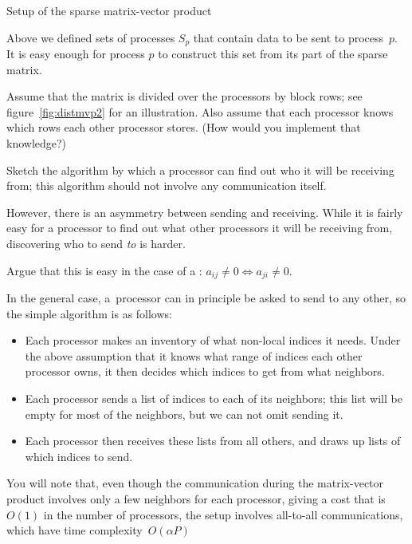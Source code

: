  {Setup of the sparse matrix-vector product}
\label{sec:par-spmvp-setup}

Above we defined sets of processes $S_p$ that contain data
to be sent to process~$p$.
It is easy enough for process $p$ to construct this set
from its part of the sparse matrix.

\begin{exercise}
  Assume that the matrix is divided over the processors by block rows;
  see figure~\ref{fig:distmvp2} for an illustration. Also assume that each processor
  knows which rows each other processor stores. (How would you implement that knowledge?)

  Sketch the algorithm by which a processor can find out who it will
  be receiving from; this algorithm should not involve any
  communication itself.
\end{exercise}

However, there is an asymmetry between sending and receiving.
While it is fairly easy for a processor to find out what other processors
it will be receiving from,
discovering who to send \emph{to} is harder.

\begin{exercise}
  Argue that this is easy in the case of a 
  :
  $a_{ij}\not=0\Leftrightarrow a_{ji}\not=0$.
\end{exercise}

In the general case, a~processor can in principle be asked to send to any other,
so the simple algorithm is as follows:
\begin{itemize}
\item Each processor makes an inventory of what non-local indices it
  needs. Under the above assumption that it knows what range of indices each
  other processor owns, it then decides which indices to get from what
  neighbors.
\item Each processor sends a list of indices to each of its
  neighbors; this list will be empty for most of the neighbors, but
  we can not omit sending it.
\item Each processor then receives these lists from all others, and
  draws up lists of which indices to send.
\end{itemize}
You will note that, even though the communication during the
matrix-vector product involves only a few neighbors for each
processor, giving a cost that is $O(1)$ in the number of processors,
the setup involves all-to-all communications, which 
have time complexity~$O(\alpha P)$

